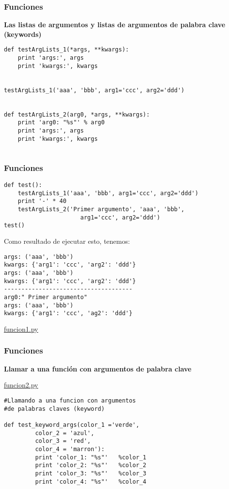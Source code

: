 \documentclass[10pt]{beamer}
\begin{document}
\begin{frame}[fragile]
\frametitle{Funciones}
\textbf{Las listas de argumentos y listas de argumentos de palabra clave (keywords)}

\vspace{0.3cm}

\begin{lstlisting}
def testArgLists_1(*args, **kwargs):
    print 'args:', args
    print 'kwargs:', kwargs


testArgLists_1('aaa', 'bbb', arg1='ccc', arg2='ddd')


def testArgLists_2(arg0, *args, **kwargs):
    print 'arg0: "%s"' % arg0
    print 'args:', args
    print 'kwargs:', kwargs


\end{lstlisting}

\end{frame}

\begin{frame}[fragile]
\frametitle{Funciones}
\begin{lstlisting}
def test():
    testArgLists_1('aaa', 'bbb', arg1='ccc', arg2='ddd')
    print '-' * 40
    testArgLists_2('Primer argumento', 'aaa', 'bbb', 
                      arg1='ccc', arg2='ddd')
test()
\end{lstlisting}


\vspace{0.3cm}

\footnotesize{Como resultado de ejecutar esto, tenemos:}

\begin{lstlisting}
args: ('aaa', 'bbb')
kwargs: {'arg1': 'ccc', 'arg2': 'ddd'}
args: ('aaa', 'bbb')
kwargs: {'arg1': 'ccc', 'arg2': 'ddd'}
-------------------------------------
arg0:" Primer argumento"
args: ('aaa', 'bbb')
kwargs: {'arg1': 'ccc', 'ag2': 'ddd'}
\end{lstlisting}
\href{run:funcion1.py}{\underline{funcion1.py}}
\end{frame}


\begin{frame}[fragile]
\frametitle{Funciones}
\textbf{Llamar a una funci\'on con argumentos de palabra clave}

\href{run:funcion1.py}{\underline{funcion2.py}}
\vspace{0.3cm}

\begin{lstlisting}
#Llamando a una funcion con argumentos
#de palabras claves (keyword)
 
def test_keyword_args(color_1 ='verde',
         color_2 = 'azul',
	     color_3 = 'red',
         color_4 = 'marron'):
         print 'color_1: "%s"'   %color_1
         print 'color_2: "%s"'   %color_2
         print 'color_3: "%s"'   %color_3
         print 'color_4: "%s"'   %color_4
\end{lstlisting}
\end{frame}
\end{document}
